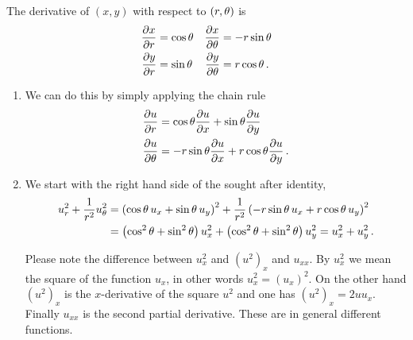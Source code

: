 \begin{solution}
The derivative of $(x,y)$ with respect to $(r,\theta)$ is
\begin{align*}
\frac{\partial x}{\partial r} &= \cos \theta & \frac{\partial x}{\partial \theta} &= -r \sin \theta \\
\frac{\partial y}{\partial r} &= \sin \theta & \frac{\partial y}{\partial \theta} &= r \cos \theta\,.
\end{align*}
\begin{enumerate}
\item
We can do this by simply applying the chain rule
\begin{align*}
\frac{\partial u}{\partial r} &= \cos \theta \frac{\partial u}{\partial x} + \sin \theta \frac{\partial u}{\partial y} \\
\frac{\partial u}{\partial \theta} &= -r \sin\theta \frac{\partial u}{\partial x} + r\cos \theta \frac{\partial u}{\partial y}\,.
\end{align*}

\item
We start with the right hand side of the sought after identity,
\begin{align*}
u_r^2 + \frac 1{r^2} u_\theta^2
&= \left(\cos \theta\,u_x + \sin\theta \, u_y\right)^2
+ \frac{1}{r^2} \left( -r\sin \theta\, u_x + r \cos \theta \,u_y\right)^2 \\
&= \left(\cos^2 \theta + \sin^2 \theta\right) u_x^2 + 
\left(\cos^2 \theta + \sin^2 \theta\right) u_y^2
= u_x^2 + u_y^2\,.
\end{align*}

Please note the difference between $u_x^2$ and $(u^2)_x$ and $u_{xx}$. By $u_x^2$ we mean the square of the function $u_x$, in other words $u_x^2 = (u_x)^2$. On the other hand $(u^2)_x$ is the $x$-derivative of the square $u^2$ and one has $(u^2)_x = 2uu_x$. Finally $u_{xx}$ is the second partial derivative. These are in general different functions.


\end{enumerate}
\end{solution}
